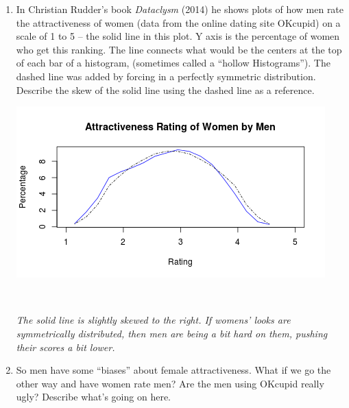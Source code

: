 \begin{enumerate}
\begin{enumerate}
\begin{key}
  {\it  Q1: \$90k, Mdedian: \$110k, Q3: \$135K, IQR: \$25k}
\end{key}
    \item For these data, which is a better summary: mean and standard
      deviation?  or median and IQR? Why?
\begin{students}
    \vspace{1cm}    
\end{students}

\begin{key}
  {\it median and IQR -- due to skewness.}
\end{key}
    \end{enumerate}


  \item In Christian Rudder's book {\it Dataclysm} (2014) he shows
    plots of how men rate the attractiveness of women (data from the
    online dating site OKcupid) on a scale of 1 to 5 -- the solid line
    in this plot.  Y axis is the percentage of women who get this
    ranking. The line connects what would be the centers at the top of
    each bar of a histogram, (sometimes called a ``hollow
    Histograms'').  The dashed line was added by forcing in a
    perfectly symmetric distribution. Describe the skew of the solid
    line using the dashed line as a reference.


\includegraphics[width=.4\linewidth]{../plots/menRateWomen.png}

\begin{students}
   \   \vspace{2cm}    
\end{students}

\begin{key}
  {\it The solid line is slightly skewed to the right. If womens'
    looks are symmetrically distributed, then men are being a bit hard
  on them, pushing their scores a bit lower.}
\end{key}


\item So men have some ``biases'' about female attractiveness.  What
  if we go the other way and have women rate men?  Are the men using
  OKcupid really ugly?  Describe what's going on here.


\end{enumerate}
